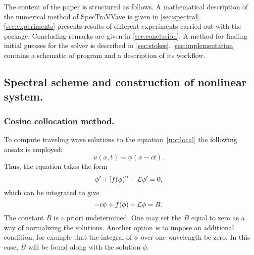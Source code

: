 The content of the paper is structured as follows. A mathematical description of the numerical method of 
\textsf{SpecTraVVave} is given in \autoref{sec:spectral}. \autoref{sec:experiments} presents results of different experiments carried out with the package. Concluding remarks are given in \autoref{sec:conclusion}. A method for finding initial guesses for the solver is described in \autoref{sec:stokes}. \autoref{sec:implementation} contains a schematic of program and a description of its workflow.

\subsection{Spectral scheme and construction of nonlinear system.}
\label{sec:spectral}
\subsubsection{Cosine collocation method.}
To compute traveling wave solutions to the equation~\eqref{nonlocal} the following ansatz is employed:
\begin{equation*}%
u(x,t) = \phi(x-ct).
\end{equation*}
Thus, the equation takes the form
\begin{equation*}%
\phi' + \left[f(\phi) \right]' + \Lop \phi' = 0,
\end{equation*}
which can be integrated to give
\begin{equation}\label{int_gen1}
-c \phi + f(\phi)  + \mathcal{L} \phi = B. 
\end{equation}
The constant $B$ is a priori undetermined. One may set the $B$ equal to 
zero as a way of normalizing the solutions. Another option is to impose
an additional condition, for example that the integral of $\phi$ over
one wavelength be zero. In this case, $B$ will be found along with the solution $\phi$.

